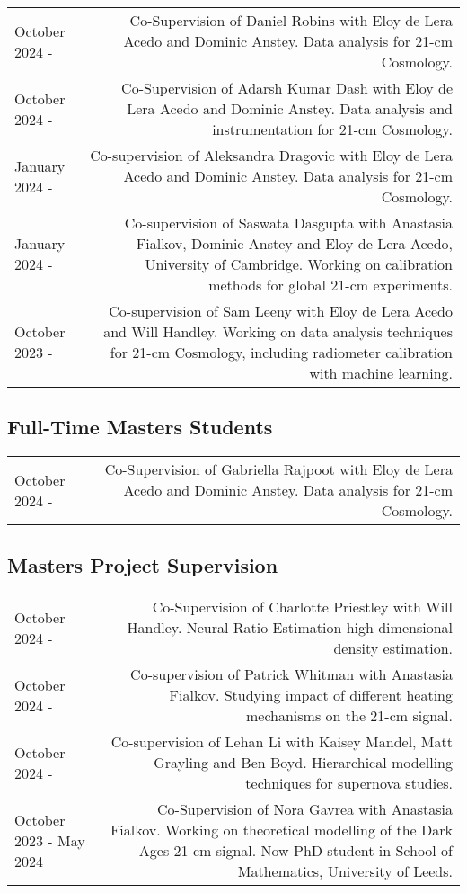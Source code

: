 \documentclass{article}
\begin{document}
\begin{tabular}{L!{\vrule}R}
    October 2024 - & Co-Supervision of Daniel Robins with Eloy de Lera Acedo and Dominic Anstey. Data analysis for 21-cm Cosmology.\\
    October 2024 - & Co-Supervision of Adarsh Kumar Dash with Eloy de Lera Acedo and Dominic Anstey. Data analysis and instrumentation for 21-cm Cosmology.\\
    January 2024 - & Co-supervision of Aleksandra Dragovic with Eloy de Lera Acedo and Dominic Anstey. Data analysis for 21-cm Cosmology. \\
    January 2024 - & Co-supervision of Saswata Dasgupta with Anastasia Fialkov, Dominic Anstey and Eloy de Lera Acedo, University of Cambridge. Working on calibration methods for global 21-cm experiments. \\
	October 2023 - & Co-supervision of Sam Leeny with Eloy de Lera Acedo and Will Handley. Working on data analysis techniques for 21-cm Cosmology, including  radiometer calibration with machine learning. \\
\end{tabular}

\subsection*{Full-Time Masters Students}

\begin{tabular}{L!{\vrule}R}
    October 2024 - & Co-Supervision of Gabriella Rajpoot with Eloy de Lera Acedo and Dominic Anstey. Data analysis for 21-cm Cosmology. \\
\end{tabular}

\subsection*{Masters Project Supervision}

\begin{tabular}{L!{\vrule}R}
    October 2024 - & Co-Supervision of Charlotte Priestley  with Will Handley. Neural Ratio Estimation high dimensional density estimation. \\
    October 2024 - & Co-supervision of Patrick Whitman with Anastasia Fialkov. Studying impact of different heating mechanisms on the 21-cm signal. \\
    October 2024 - & Co-supervision of Lehan Li with Kaisey Mandel, Matt Grayling and Ben Boyd. Hierarchical modelling techniques for supernova studies. \\
    October 2023 - May 2024 & Co-Supervision of Nora Gavrea with Anastasia Fialkov. Working on theoretical modelling of the Dark Ages 21-cm signal. Now PhD student in School of Mathematics, University of Leeds. \\
\end{tabular}
\end{document}
